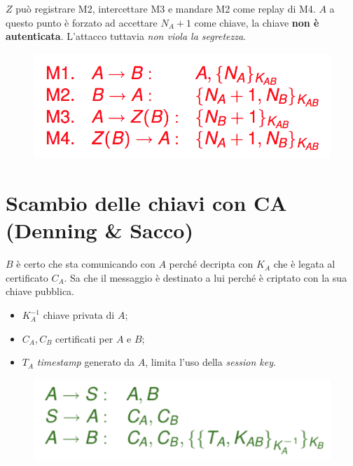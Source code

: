 \documentclass[11pt, a4paper, twoside, italian]{report}
\theoremstyle{plain}
\begin{document}
\begin{multicols}{2}
	\noindent
	$Z$ può registrare M2, intercettare M3 e mandare M2 come replay di M4. $A$ a questo punto è forzato ad accettare $N_{A} +1$ come chiave, la chiave \textbf{non è autenticata}. L'attacco tuttavia \textit{non viola la segretezza}.
\columnbreak
	\begin{figure}[H]
		\centering
		\includegraphics[scale=0.43]{andrewsecurerpctypeflawattack}
	\end{figure}
\end{multicols}


\section*{Scambio delle chiavi con CA (Denning \& Sacco)}
\begin{multicols}{3}
	\noindent
	$B$ è certo che sta comunicando con $A$ perché decripta con $K_A$ che è legata al certificato $C_A$. Sa che il messaggio è destinato a lui perché è criptato con la sua chiave pubblica.
\columnbreak
	\begin{itemize}
		\item $K_A^{-1}$ chiave privata di $A$;
		\item $C_A, C_B$ certificati per $A$ e $B$;
		\item $T_A$ \textit{timestamp} generato da $A$, limita l'uso della \textit{session key}.
	\end{itemize}
\columnbreak
	\begin{figure}[H]
		\centering
		\includegraphics[scale=0.75]{denningsacco}
	\end{figure}
\end{multicols}
\end{document}
